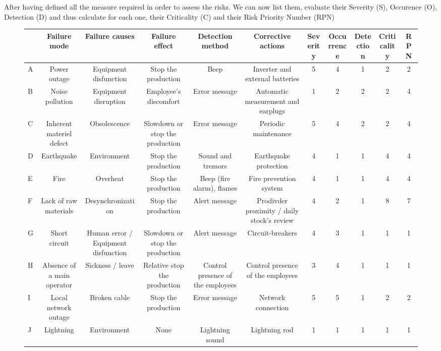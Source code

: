 After having defined all the measure required in order to assess the risks. We can now list them, evaluate their Severity (S), Occurence (O), Detection (D) and thus calculate for each one, their Criticality (C) and their Risk Priority Number (RPN)

\begin{figure}[h]
    \centering
    \begin{tabular}{| p{4cm} | c | c | c | c | c | c | c | c | c | c |}
        \hline
        \rowcolor{heading-color}\multicolumn{1}{|c|}{Identifier} & Failure mode & Failure causes & Failure effect & Detection method & Corrective actions & Severity & Occurrence & Detection & Criticality & RPN\\
        \hline
        A & Power outage & Equipment disfunction & Stop the production & Beep & Inverter and external batteries & 5 & 4 & 1 & 2 & 2 \\
        \hline
        B & Noise pollution & Equipment disruption & Employee's discomfort & Error message & Automatic measurement and earplugs & 1 & 2 & 2 & 2 & 4 \\
        \hline
         C & Inherent materiel defect & Obsolescence & Slowdown or stop the production & Error message & Periodic maintenance & 5 & 4 & 2 & 2 & 4 \\
        \hline
        D & Earthquake & Environment & Stop the production & Sound and tremors & Earthquake protection & 4 & 1 & 1 & 4 & 4 \\
        \hline
        E & Fire & Overheat & Stop the production & Beep (fire alarm), flames & Fire prevention system & 4 & 1 & 1 & 4 & 4 \\
        \hline
        F & Lack of raw materials & Desynchronization & Stop the production & Alert message & Prodivder proximity / daily stock's review & 4 & 2 & 1 & 8 & 7 \\
        \hline
        G & Short circuit & Human error / Equipment disfunction & Slowdown or stop the production & Alert message & Circuit-breakers & 4 & 3 & 1 & 1 & 1 \\
        \hline
        H & Absence of a main operator & Sickness / leave & Relative stop the production & Control presence of the employees & Control presence of the employees & 3 & 4 & 1 & 1 & 1 \\
        \hline
        I & Local network outage & Broken cable & Stop the production & Error message & Network connection & 5 & 5 & 1 & 2 & 2 \\
        \hline
        J & Lightning & Environment & None & Lightning sound & Lightning rod & 1 & 1 & 1 & 1 & 1 \\

\end{tabular}
\end{figure}
